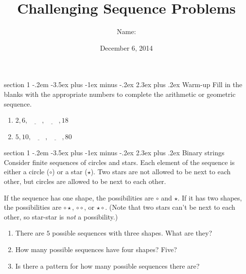 \documentclass[12pt,letterpaper]{article}
\title{Challenging Sequence Problems}
\author{Name: \underline{\hspace{5cm}}}
\date{December 6, 2014}
\makeatletter
\newenvironment{problem}{\@startsection
       {section}
       {1}
       {-.2em}
       {-3.5ex plus -1ex minus -.2ex}
       {2.3ex plus .2ex}
       {\pagebreak[3]
       \large\bf\noindent{Problem }
       }
       }
\makeatother
\begin{document}
\maketitle

\thispagestyle{empty}

\begin{problem}{Warm-up}
Fill in the blanks with the appropriate numbers to complete the arithmetic or geometric sequence.

\begin{enumerate}
 \item $2, 6, \underline{\hspace{2em}}, \underline{\hspace{2em}}, 18$
 \item $5, 10, \underline{\hspace{2em}}, \underline{\hspace{2em}}, 80$
\end{enumerate}
\end{problem}

\begin{problem}{Binary strings}
 Consider finite sequences of circles and stars. Each element of the sequence is either a
 circle ($\circ$) or a star ($\star$). Two stars are not allowed to be next to each other, but circles
 are allowed to be next to each other.
 
 If the sequence has one shape, the possibilities are $\circ$ and $\star$. If it has two shapes, the
 possibilities are $\circ \star$, $\circ \circ$, or $\star \circ$. (Note that two stars can't be next
 to each other, so star-star is \emph{not} a possibility.)
 
 \begin{enumerate}
  \item There are $5$ possible sequences with three shapes. What are they?
  \item How many possible sequences have four shapes? Five?
  \item Is there a pattern for how many possible sequences there are?
 \end{enumerate}
\end{problem}
\end{document}
